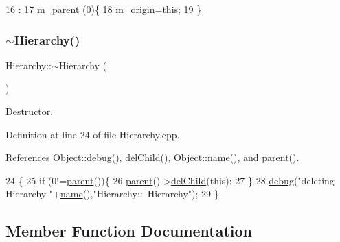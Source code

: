 \begin{DoxyCode}
16                        :
17   \hyperlink{classHierarchy_a5814bb280d4e8539ab25ab6cbfb9cc4f}{m\_parent} (0)\{
18   \hyperlink{classHierarchy_a16c73e557d3a7c156ffb5dc4102d148e}{m\_origin}=\textcolor{keyword}{this};
19 \}
\end{DoxyCode}
\mbox{\label{classHierarchy_a8f29c4c38606352e2472d95b08c503d0}} 
\subsubsection{\texorpdfstring{$\sim$\+Hierarchy()}{~Hierarchy()}}
{\footnotesize\ttfamily Hierarchy\+::$\sim$\+Hierarchy (\begin{DoxyParamCaption}{ }\end{DoxyParamCaption})\hspace{0.3cm}{\ttfamily [virtual]}}



Destructor. 



Definition at line 24 of file Hierarchy.\+cpp.



References Object\+::debug(), del\+Child(), Object\+::name(), and parent().


\begin{DoxyCode}
24                       \{
25   \textcolor{keywordflow}{if} (0!=\hyperlink{classHierarchy_a1c7bec8257e717f9c1465e06ebf845fc}{parent}())\{
26     \hyperlink{classHierarchy_a1c7bec8257e717f9c1465e06ebf845fc}{parent}()->\hyperlink{classHierarchy_a2b2b359fac003233f65786a616766bde}{delChild}(\textcolor{keyword}{this});
27   \}
28   \hyperlink{classObject_aac010553f022165573714b7014a15f0d}{debug}(\textcolor{stringliteral}{"deleting Hierarchy "}+\hyperlink{classObject_a300f4c05dd468c7bb8b3c968868443c1}{name}(),\textcolor{stringliteral}{"Hierarchy::~Hierarchy"});
29 \}
\end{DoxyCode}


\subsection{Member Function Documentation}
\mbox{\label{classAttrib_a235f773af19c900264a190b00a3b4ad7}} 
